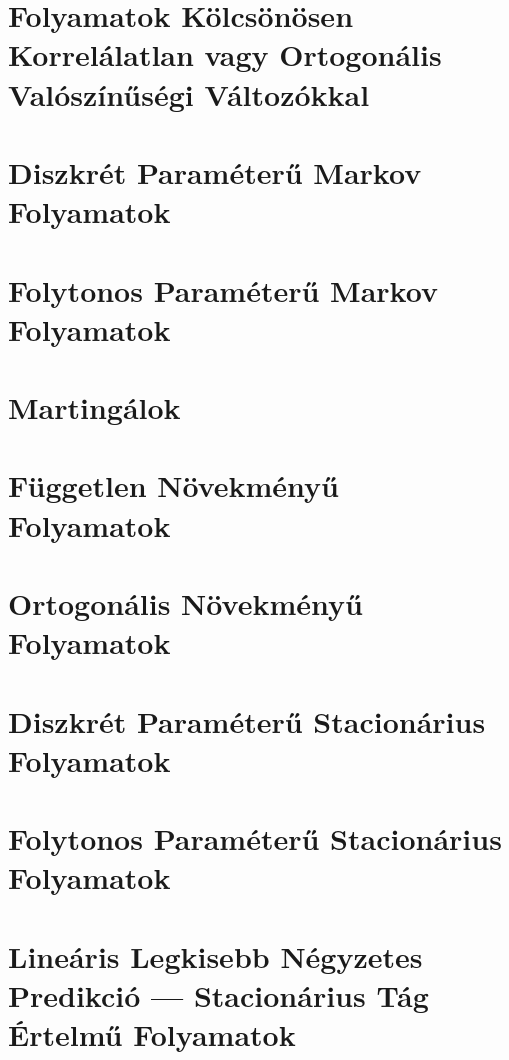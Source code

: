 \documentclass{article}
\begin{document}
\section{Folyamatok Kölcsönösen Korrelálatlan vagy Ortogonális Valószínűségi Változókkal}\label{sec:folyamatokkolcsonosenkorrelalatlanvagyortogonalisvaloszinusegivaltozokkal}
\section{Diszkrét Paraméterű Markov Folyamatok}\label{sec:diszkretparameterumarkov}
\section{Folytonos Paraméterű Markov Folyamatok}\label{sec:folytonosparameterumarkov}
\section{Martingálok}\label{sec:martingalok}
\section{Független Növekményű Folyamatok}\label{sec:fuggetlennovekmenyufolyamatok}
\section{Ortogonális Növekményű Folyamatok}\label{sec:ortogonalisnovekmenyufolyamatok}
\section{Diszkrét Paraméterű Stacionárius Folyamatok}\label{sec:diszkretparameterustacionariusfolyamatok}
\section{Folytonos Paraméterű Stacionárius Folyamatok}\label{sec:folytonosparameterustacionariusfolyamatok}
\section{Lineáris Legkisebb Négyzetes Predikció --- Stacionárius Tág Értelmű Folyamatok}\label{sec:llsp}
\end{document}
